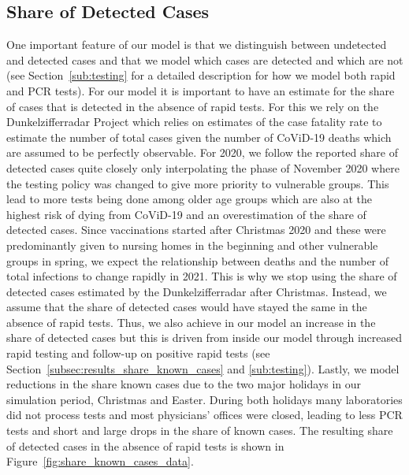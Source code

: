 \subsection{Share of Detected Cases}
\label{subsec:data_share_known_cases}


One important feature of our model is that we distinguish between undetected and detected
cases and that we model which cases are detected and which are not (see
Section~\ref{sub:testing} for a detailed description for how we model both rapid and PCR
tests). For our model it is important to have an estimate for the share of cases that is
detected in the absence of rapid tests. For this we rely on the Dunkelzifferradar Project
\citep{Dunkelzifferradar2020} which relies on estimates of the case fatality rate to
estimate the number of total cases given the number of CoViD-19 deaths which are assumed
to be perfectly observable. For 2020, we follow the reported share of detected cases
quite closely only interpolating the phase of November 2020 where the testing policy was
changed to give more priority to vulnerable groups. This lead to more tests being done
among older age groups which are also at the highest risk of dying from CoViD-19 and an
overestimation of the share of detected cases.
Since vaccinations started after Christmas 2020 and these were predominantly given to
nursing homes in the beginning and other vulnerable groups in spring, we expect the
relationship between deaths and the number of total infections to change rapidly in 2021.
This is why we stop using the share of detected cases estimated by the Dunkelzifferradar
after Christmas. Instead, we assume that the share of detected cases would have
stayed the same in the absence of rapid tests. Thus, we also achieve in our model an
increase in the share of detected cases but this is driven from inside our model through
increased rapid testing and follow-up on positive rapid tests (see
Section~\ref{subsec:results_share_known_cases} and \ref{sub:testing}).
Lastly, we model reductions in the share known cases due to the two major holidays in our
simulation period, Christmas and Easter. During both holidays many laboratories did not
process tests and most physicians' offices were closed, leading to less PCR tests and
short and large drops in the share of known cases. The resulting share of detected cases
in the absence of rapid tests is shown in Figure~\ref{fig:share_known_cases_data}.

